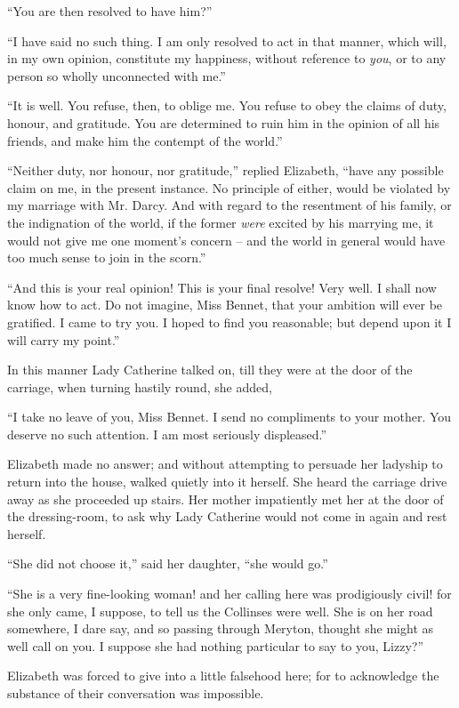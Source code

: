 “You are then resolved to have him?”

“I have said no such thing. I am only resolved to act
in that manner, which will, in my own opinion, constitute
my happiness, without reference to \textit{you}, or to any person
so wholly unconnected with me.”

“It is well. You refuse, then, to oblige me. You refuse
to obey the claims of duty, honour, and gratitude. You
are determined to ruin him in the opinion of all his friends,
and make him the contempt of the world.”

“Neither duty, nor honour, nor gratitude,” replied
Elizabeth, “have any possible claim on me, in the present
instance. No principle of either, would be violated by
my marriage with Mr. Darcy. And with regard to the
resentment of his family, or the indignation of the world,
if the former \textit{were} excited by his marrying me, it would
not give me one moment’s concern -- and the world in
general would have too much sense to join in the scorn.”

“And this is your real opinion! This is your final
resolve! Very well. I shall now know how to act. Do
not imagine, Miss Bennet, that your ambition will ever
be gratified. I came to try you. I hoped to find you
reasonable; but depend upon it I will carry my point.”

In this manner Lady Catherine talked on, till they were
at the door of the carriage, when turning hastily round,
she added,

“I take no leave of you, Miss Bennet. I send no compliments
to your mother. You deserve no such attention.
I am most seriously displeased.”

Elizabeth made no answer; and without attempting
to persuade her ladyship to return into the house, walked
quietly into it herself. She heard the carriage drive away
as she proceeded up stairs. Her mother impatiently met
her at the door of the dressing-room, to ask why Lady
Catherine would not come in again and rest herself.

“She did not choose it,” said her daughter, “she
would go.”

“She is a very fine-looking woman! and her calling
here was prodigiously civil! for she only came, I suppose,
to tell us the Collinses were well. She is on her road
somewhere, I dare say, and so passing through Meryton,
thought she might as well call on you. I suppose she had
nothing particular to say to you, Lizzy?”

Elizabeth was forced to give into a little falsehood
here; for to acknowledge the substance of their conversation
was impossible.

